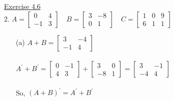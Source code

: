 \documentclass{./../../Latex/handout}
\begin{document}
\underline{Exercise 4.6}  \\

2. $
A=\left[\begin{array}{cc}
0 & 4 \\
-1 & 3
\end{array}\right] \quad B=\left[\begin{array}{cc}
3 & -8 \\
0 & 1
\end{array}\right] \quad C=\left[\begin{array}{lll}
1 & 0 & 9 \\
6 & 1 & 1
\end{array}\right]
$ \\

\begin{itemize}

\item[(a)] \( A+B=\left[\begin{array}{cc}3 & -4 \\ -1 & 4\end{array}\right] \) \\~\\
\( A^{\prime}+B^{\prime}=\left[\begin{array}{rr}0 & -1 \\ 4 & 3\end{array}\right]+\left[\begin{array}{cc}3 & 0 \\ -8 & 1\end{array}\right]=\left[\begin{array}{cc}3 & -1 \\ -4 & 4\end{array}\right] \) \\~\\
So, \((A+B)^{\prime}=A^{\prime}+B^{\prime}\) \\



\end{itemize}
\end{document}
